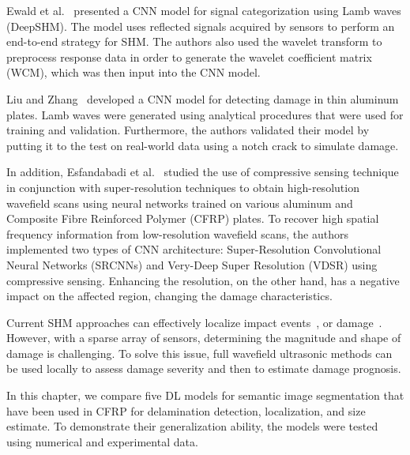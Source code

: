 Ewald et al.~\cite{Ewald2019b} presented a CNN model for signal categorization using Lamb waves (DeepSHM).
The model uses reflected signals acquired by sensors to perform an end-to-end strategy for SHM.
The authors also used the wavelet transform to preprocess response data in order to generate the wavelet coefficient matrix (WCM), which was then input into the CNN model.

Liu and Zhang~\cite{Liu2020a} developed a CNN model for detecting damage in thin aluminum plates.
Lamb waves were generated using analytical procedures that were used for training and validation.
Furthermore, the authors validated their model by putting it to the test on real-world data using a notch crack to simulate damage.

In addition, Esfandabadi et al.~\cite{esfandabadideep} studied the use of compressive sensing technique~\cite{Candes2006} in conjunction with super-resolution techniques to obtain high-resolution wavefield scans using neural networks trained on various aluminum and Composite Fibre Reinforced Polymer (CFRP) plates.
To recover high spatial frequency information from low-resolution wavefield scans, the authors implemented two types of CNN architecture: Super-Resolution Convolutional Neural Networks (SRCNNs) and Very-Deep Super Resolution (VDSR) using compressive sensing.
Enhancing the resolution, on the other hand, has a negative impact on the affected region, changing the damage characteristics.

Current SHM approaches can effectively localize impact events~\cite{Ciampa2012}, or damage~\cite{Nokhbatolfoghahai2020}.
However, with a sparse array of sensors, determining the magnitude and shape of damage is challenging.
To solve this issue, full wavefield ultrasonic methods can be used locally to assess damage severity and then to estimate damage prognosis.

In this chapter, we compare five DL models for semantic image segmentation that have been used in CFRP for delamination detection, localization, and size estimate.
To demonstrate their generalization ability, the models were tested using numerical and experimental data.
